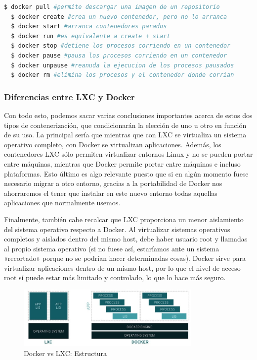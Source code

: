 \begin{lstlisting}[language=bash]
  $ docker pull #permite descargar una imagen de un repositorio
  $ docker create #crea un nuevo contenedor, pero no lo arranca 
  $ docker start #arranca contenedores parados
  $ docker run #es equivalente a create + start
  $ docker stop #detiene los procesos corriendo en un contenedor  
  $ docker pause #pausa los procesos corriendo en un contenedor
  $ docker unpause #reanuda la ejecucion de los procesos pausados
  $ docker rm #elimina los procesos y el contenedor donde corrian
\end{lstlisting}

\subsubsection{Diferencias entre LXC y Docker}
	Con todo esto, podemos sacar varias conclusiones importantes acerca de estos dos tipos de contenerización, que condicionarán la elección de uno u otro en función de su uso. La principal sería que mientras que con LXC se virtualiza un sistema operativo completo, con Docker se virtualizan aplicaciones. Además, los contenedores LXC sólo permiten virtualizar entornos Linux y no se pueden portar entre máquinas, mientras que Docker permite portar entre máquinas e incluso plataformas. Esto último es algo relevante puesto que si en algún momento fuese necesario migrar a otro entorno, gracias a la portabilidad de Docker nos ahorraremos el tener que instalar en este nuevo entorno todas aquellas aplicaciones que normalmente usemos. 

	Finalmente, también cabe recalcar que LXC proporciona un menor aislamiento del sistema operativo respecto a Docker. Al virtualizar sistemas operativos completos y aislados dentro del mismo host, debe haber usuario root y llamadas al propio sistema operativo (si no fuese así, estaríamos ante un sistema «recortado» porque no se podrían hacer determinadas cosas). Docker sirve para virtualizar aplicaciones dentro de un mismo host, por lo que el nivel de acceso root sí puede estar más limitado y controlado, lo que lo hace más seguro.

	\vspace{0.2cm}
	\begin{figure}[h]
	\centering
	\includegraphics[width=0.8\textwidth]{../imgs/EdA/LXCvsDocker.jpg}
	\caption{Docker vs LXC: Estructura}
	\label{figure:LXCvsDocker}
	\end{figure}
	\clearpage

